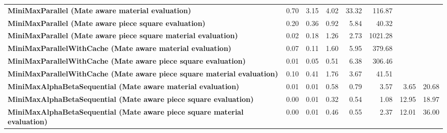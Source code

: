 \begin{table}[H]
{\begin{tabular}{|p{8cm}|*{7}{r|}}
            \rowcolor[HTML]{FFFFFF}
            \textbf{MiniMaxParallel (Mate aware material evaluation)}                                  & 0.70                                  & 3.15                                  & 4.02                                  & 33.32                                 & 116.87 &  &  \\
            \rowcolor[HTML]{EFEFEF}
            \textbf{MiniMaxParallel (Mate aware piece square evaluation)}                              & 0.20                                  & 0.36                                  & 0.92                                  & 5.84 & 40.32 &  &  \\
            \rowcolor[HTML]{FFFFFF}
            \textbf{MiniMaxParallel (Mate aware piece square material evaluation)}                     & 0.02                                  & 0.18 & 1.26 & 2.73 & 1021.28 &  &  \\

            \rowcolor[HTML]{EFEFEF}
            \textbf{MiniMaxParallelWithCache (Mate aware material evaluation)}                         & 0.07                                  & 0.11                                  & 1.60 & 5.95 & 379.68 &  &  \\
            \rowcolor[HTML]{FFFFFF}
            \textbf{MiniMaxParallelWithCache (Mate aware piece square evaluation)}                     & 0.01                                  & 0.05 & 0.51 & 6.38 & 306.46 &  &  \\
            \rowcolor[HTML]{EFEFEF}
            \textbf{MiniMaxParallelWithCache (Mate aware piece square material evaluation)}            & 0.10 & 0.41 & 1.76 & 3.67 & 41.51 &  &  \\

            \rowcolor[HTML]{FFFFFF}
            \textbf{MiniMaxAlphaBetaSequential (Mate aware material evaluation)}                       & 0.01                                  & 0.01                                  & 0.58 & 0.79 & 3.57 & 3.65 & 20.68 \\
            \rowcolor[HTML]{EFEFEF}
            \textbf{MiniMaxAlphaBetaSequential (Mate aware piece square evaluation)}                   & 0.00                                  & 0.01 & 0.32 & 0.54 & 1.08 & 12.95 & 18.97 \\
            \rowcolor[HTML]{FFFFFF}
            \textbf{MiniMaxAlphaBetaSequential (Mate aware piece square material evaluation)}               & 0.00 & 0.01 & 0.46 & 0.55 & 2.37 & 12.01 & 36.00 \\


\end{tabular}}
\end{table}
